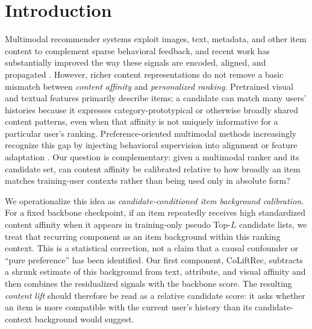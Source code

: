 \documentclass[sigconf,anonymous,review]{acmart}
\newcommand{\methodname}{CoLiftRec}
\begin{document}
\maketitle

\section{Introduction}
\label{sec:introduction}

Multimodal recommender systems exploit images, text, metadata, and other item content to complement sparse behavioral feedback, and recent work has substantially improved the way these signals are encoded, aligned, and propagated \cite{wei2019mmgcn,zhang2021lattice,zhou2023bm3,wei2023mmssl,zhou2023freedom,guo2024lgmrec}.
However, richer content representations do not remove a basic mismatch between \emph{content affinity} and \emph{personalized ranking}.
Pretrained visual and textual features primarily describe items; a candidate can match many users' histories because it expresses category-prototypical or otherwise broadly shared content patterns, even when that affinity is not uniquely informative for a particular user's ranking.
Preference-oriented multimodal methods increasingly recognize this gap by injecting behavioral supervision into alignment or feature adaptation \cite{xv2024damrs,li2024whotoalign,liu2024alignrec,xu2025mentor,fan2025befa}.
Our question is complementary: given a multimodal ranker and its candidate set, can content affinity be calibrated relative to how broadly an item matches training-user contexts rather than being used only in absolute form?

We operationalize this idea as \emph{candidate-conditioned item background calibration}.
For a fixed backbone checkpoint, if an item repeatedly receives high standardized content affinity when it appears in training-only pseudo Top-$L$ candidate lists, we treat that recurring component as an item background within this ranking context.
This is a statistical correction, not a claim that a causal confounder or ``pure preference'' has been identified.
Our first component, \methodname, subtracts a shrunk estimate of this background from text, attribute, and visual affinity and then combines the residualized signals with the backbone score.
The resulting \emph{content lift} should therefore be read as a relative candidate score: it asks whether an item is more compatible with the current user's history than its candidate-context background would suggest.
\end{document}
